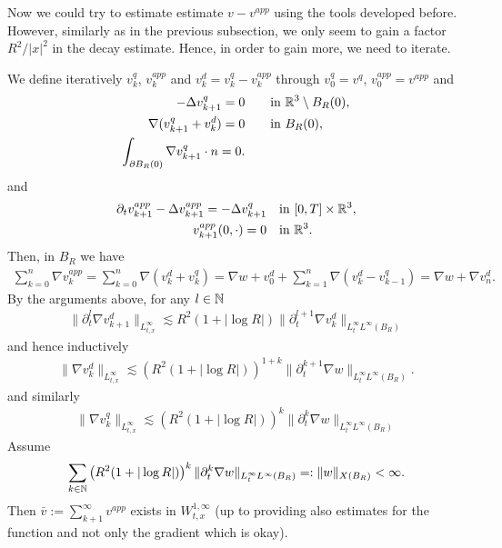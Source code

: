 \documentclass[abstracton, paper=a4, fontsize=11pt,DIV=12,bibliography=totoc]{scrartcl}
\begin{document}
Now we could try to estimate estimate $v - v^{app}$ using the tools developed before. However, similarly as in the previous subsection, we only seem to gain a factor $R^2/|x|^2$ in the decay estimate. 
Hence, in order to gain more, we need to iterate. 

We define iteratively $v^q_k$, $v^{app}_k$ and $v^d_k = v^q_k - v^{app}_k$ through $v^q_0 = v^q$,  $v^{app}_0 = v^{app}$ and
\begin{align}
   -\Delta v^{q}_{k+1}  = 0 &\qquad  \text{in }  \mathbb{R}^3 \setminus B_R(0), \\
    \nabla (v^{q}_{k+1} +  v^{d}_{k}) = 0   & \qquad  \text{in }   B_R(0), \\
    \int_{\partial B_R(0)}  \nabla v^{q}_{k+1} \cdot n = 0.
\end{align}
and
\begin{align}
   \partial_t  v^{app}_{k+1} - \Delta v^{app}_{k+1} = -\Delta v^q_{k+1} &\quad \text{in } [0,T] \times \mathbb{R}^3, \\
   v^{app}_{k+1}(0,\cdot) = 0 & \quad \text{in } \mathbb{R}^3.
\end{align}
Then,  in $B_R$ we have
\begin{align} \label{bar.v.B_R}
   \sum_{k=0}^n \nabla v_{k}^{app} = \sum_{k=0}^n  \nabla (v_{k}^d +   v_k^q) = \nabla w  + v_{0}^d + \sum_{k=1}^n  \nabla (v_{k}^d -  v_{k-1}^q) = \nabla w + \nabla v_{n}^d.
\end{align}
By the arguments above, for any $l \in \mathbb{N}$ 
\begin{align*}
    \|\partial_t^l \nabla v^{d}_{k+1}\|_{L^\infty_{t,x}} \lesssim R^2 (1+ |\log R|) \|\partial_t^{l+1} \nabla  v^{d}_{k}\|_{L^\infty_t L^\infty(B_R)} 
\end{align*}
and hence inductively
\begin{align*}
    \|\nabla v^{d}_{k}\|_{L^\infty_{t,x}}  \lesssim \left(R^{2} (1+ |\log R|)\right)^{1+k}  \|\partial_t^{k+1} \nabla w\|_{L^\infty_t L^\infty(B_R)}.
\end{align*}
and similarly
\begin{align*}
    \|\nabla v^q_k\|_{L^\infty_{t,x}} \lesssim \left(R^{2} (1+ |\log R|)\right)^{k}  \|\partial_t^{k} \nabla w\|_{L^\infty_t L^\infty(B_R)}
\end{align*}
Assume
\begin{align}
   \sum_{k \in \mathbb{N}} \left(R^{2} (1+ |\log R|)\right)^{k}  \|\partial_t^{k} \nabla w\|_{L^\infty_t L^\infty(B_R)} =: \|w\|_{X(B_R)} < \infty.
\end{align}
Then $\bar v:= \sum_{k+1}^\infty v^{app}$ exists in  $W^{1,\infty}_{t,x}$ (up to providing also estimates for the function and not only the gradient which is okay).
\end{document}
